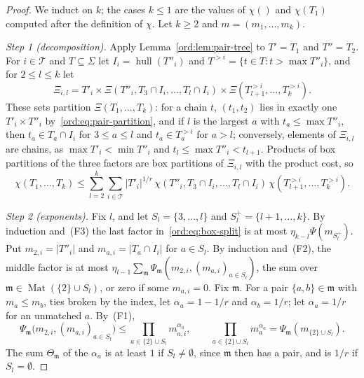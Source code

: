 \documentclass[11pt]{amsart}
\theoremstyle{definition}
\theoremstyle{remark}
\numberwithin{equation}{section}
\newcommand{\abs}[1]{\lvert #1\rvert}
\theoremstyle{plain}
\theoremstyle{definition}
\theoremstyle{plain}
\begin{document}
\begin{proof}
We induct on $k$; the cases $k\le1$ are the values of $\chi()$ and $\chi(T_1)$ computed after the definition of $\chi$.
Let $k\ge2$ and $m=(m_1,\dots,m_k)$.

\emph{Step 1 (decomposition).} Apply Lemma~\ref{ord:lem:pair-tree} to $T'=T_1$ and $T''=T_2$. For $i\in\mathcal T$ and
$T\subseteq\Sigma$ let $I_i=\operatorname{hull}(T''_i)$ and $T^{>i}=\{t\in T:t>\max T''_i\}$, and for $2\le l\le k$ let
\[
 \Xi_{i,l}=T'_i\times\Xi(T''_i,T_3\cap I_i,\dots,T_l\cap I_i)\times\Xi(T_{l+1}^{>i},\dots,T_k^{>i}).
\]
These sets partition $\Xi(T_1,\dots,T_k)$: for a chain $t$, $(t_1,t_2)$ lies in exactly one $T'_i\times T''_i$
by~\eqref{ord:eq:pair-partition}, and if $l$ is the largest $a$ with $t_a\le\max T''_i$, then $t_a\in T_a\cap I_i$ for
$3\le a\le l$ and $t_a\in T_a^{>i}$ for $a>l$; conversely, elements of $\Xi_{i,l}$ are chains, as
$\max T'_i<\min T''_i$ and $t_l\le\max T''_i<t_{l+1}$. Products of box partitions of the three factors are box
partitions of $\Xi_{i,l}$ with the product cost, so
\begin{equation}\label{ord:eq:box-split}
 \chi(T_1,\dots,T_k)\le\sum_{l=2}^k\sum_{i\in\mathcal T}\abs{T'_i}^{1/r}\,
 \chi(T''_i,T_3\cap I_i,\dots,T_l\cap I_i)\,\chi(T_{l+1}^{>i},\dots,T_k^{>i}).
\end{equation}

\emph{Step 2 (exponents).} Fix $l$, and let $S_l=\{3,\dots,l\}$ and $S_l^+=\{l+1,\dots,k\}$. By induction and~(F3) the
last factor in~\eqref{ord:eq:box-split} is at most $\eta_{k-l}\Psi(m_{S_l^+})$. Put $m_{2,i}=\abs{T''_i}$ and
$m_{a,i}=\abs{T_a\cap I_i}$ for $a\in S_l$. By induction and~(F2), the middle factor is at most
$\eta_{l-1}\sum_{\mathfrak m}\Psi_{\mathfrak m}(m_{2,i},(m_{a,i})_{a\in S_l})$, the sum over
$\mathfrak m\in\operatorname{Mat}(\{2\}\cup S_l)$, or zero if some $m_{a,i}=0$. Fix $\mathfrak m$. For a pair
$\{a,b\}\in\mathfrak m$ with $m_a\le m_b$, ties broken by the index, let $\alpha_a=1-1/r$ and $\alpha_b=1/r$; let
$\alpha_a=1/r$ for an unmatched $a$. By~(F1),
\begin{equation}\label{ord:eq:box-exponents}
 \Psi_{\mathfrak m}\bigl(m_{2,i},(m_{a,i})_{a\in S_l}\bigr)\le\prod_{a\in\{2\}\cup S_l}m_{a,i}^{\alpha_a},\qquad
 \prod_{a\in\{2\}\cup S_l}m_a^{\alpha_a}=\Psi_{\mathfrak m}(m_{\{2\}\cup S_l}).
\end{equation}
The sum $\Theta_{\mathfrak m}$ of the $\alpha_a$ is at least $1$ if $S_l\ne\emptyset$, since $\mathfrak m$ then has a
pair, and is $1/r$ if $S_l=\emptyset$.


\end{proof}
\end{document}
